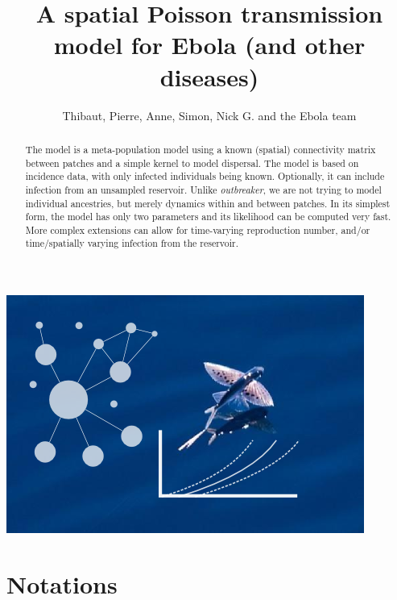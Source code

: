 \documentclass[a4paper,11pt]{article}
\title{A spatial Poisson transmission model for Ebola (and other diseases)}
\author{Thibaut, Pierre, Anne, Simon, Nick G. and the Ebola team}
\begin{document}
\maketitle

\begin{center}
\includegraphics{figs/spatialPoisson} 
\end{center}

\begin{abstract}
The model is a meta-population model using a known (spatial) connectivity matrix between patches and a simple kernel to model dispersal. 
The model is based on incidence data, with only infected individuals being 
known.
Optionally, it can include infection from an unsampled reservoir.
Unlike \textit{outbreaker}, we are not trying to model individual ancestries, 
but merely dynamics within and between patches.
In its simplest form, the model has only two parameters and its likelihood can 
be computed very fast.
More complex extensions can allow for time-varying reproduction number, and/or 
time/spatially varying infection from the reservoir.
\end{abstract}

\newpage
\section{Notations}
\end{document}
